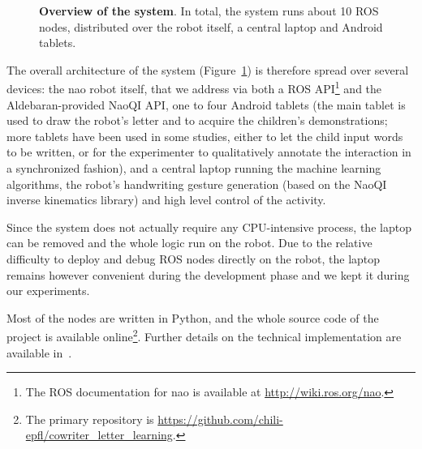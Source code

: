 \documentclass{article}
\begin{document}
\begin{figure}[ht!]
{
}

\caption{\small \textbf{Overview of the system}. In total, the system runs about 10 ROS nodes,
    distributed over the robot itself, a central laptop and Android tablets.}

    \label{fig:archi}
\end{figure}

The overall architecture of the system (Figure~\ref{fig:archi}) is therefore
spread over several devices: the {\sc nao} robot itself, that we address via
both a ROS API\footnote{The ROS documentation for {\sc nao} is available at
\url{http://wiki.ros.org/nao}.} and the Aldebaran-provided NaoQI API, one
to four Android tablets (the main tablet is used to draw the robot's letter and
to acquire the children's demonstrations; more tablets have been used in some
studies, either to let the child input words to be written, or for the
experimenter to qualitatively annotate the interaction in a synchronized
fashion), and a central laptop running the machine learning algorithms, the
robot's handwriting gesture generation (based on the NaoQI inverse kinematics
library) and high level control of the activity.

Since the system does not actually require any CPU-intensive process, the laptop
can be removed and the whole logic run on the robot. Due to the relative
difficulty to deploy and debug ROS nodes directly on the robot, the laptop
remains however convenient during the development phase and we kept it during
our experiments.

Most of the nodes are written in Python, and the whole source code of the
project is available online\footnote{The primary repository is
\url{https://github.com/chili-epfl/cowriter_letter_learning}.}. Further details
on the technical implementation are available in~\cite{hood2015when}.
\end{document}
